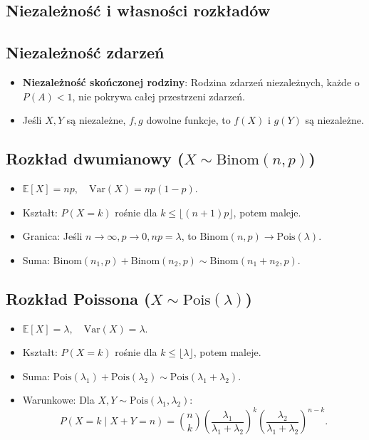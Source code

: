 \documentclass{article}
\theoremstyle{definition}
\theoremstyle{remark}
\begin{document}
\begin{multicols}{2}
    \section*{Niezależność i własności rozkładów}

    \subsection*{Niezależność zdarzeń}
    \begin{itemize}[itemsep=0pt, left=0pt]
        \item \textbf{Niezależność skończonej rodziny}: Rodzina zdarzeń niezależnych, każde o \( P(A) < 1 \), nie pokrywa całej przestrzeni zdarzeń.
        \item Jeśli \( X, Y \) są niezależne, \( f, g \) dowolne funkcje, to \( f(X) \) i \( g(Y) \) są niezależne.
    \end{itemize}
    
    \subsection*{Rozkład dwumianowy (\( X \sim \text{Binom}(n, p) \))}
    \begin{itemize}[itemsep=0pt, left=0pt]
        \item \(\mathbb{E}[X] = n p, \quad \text{Var}(X) = n p (1-p)\).
        \item Kształt: \( P(X=k) \) rośnie dla \( k \leq \lfloor (n+1)p \rfloor \), potem maleje.
        \item Granica: Jeśli \( n \to \infty, p \to 0, np = \lambda \), to \( \text{Binom}(n, p) \to \text{Pois}(\lambda) \).
        \item Suma: \( \text{Binom}(n_1, p) + \text{Binom}(n_2, p) \sim \text{Binom}(n_1+n_2, p) \).
    \end{itemize}
    
    \subsection*{Rozkład Poissona (\( X \sim \text{Pois}(\lambda) \))}
    \begin{itemize}[itemsep=0pt, left=0pt]
        \item \(\mathbb{E}[X] = \lambda, \quad \text{Var}(X) = \lambda\).
        \item Kształt: \( P(X=k) \) rośnie dla \( k \leq \lfloor \lambda \rfloor \), potem maleje.
        \item Suma: \( \text{Pois}(\lambda_1) + \text{Pois}(\lambda_2) \sim \text{Pois}(\lambda_1+\lambda_2) \).
        \item Warunkowe: Dla \( X, Y \sim \text{Pois}(\lambda_1, \lambda_2) \):
        \[
        P(X=k \mid X+Y=n) = \binom{n}{k} \left(\frac{\lambda_1}{\lambda_1+\lambda_2}\right)^k \left(\frac{\lambda_2}{\lambda_1+\lambda_2}\right)^{n-k}.
        \]
    \end{itemize}
    

\end{multicols}
\end{document}
